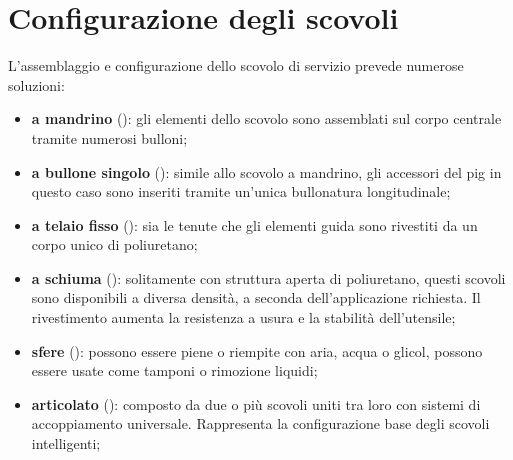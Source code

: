 \section{Configurazione degli scovoli}
L'assemblaggio e configurazione dello scovolo di servizio prevede numerose soluzioni:
\begin{itemize}
	\item \textbf{a mandrino} (): gli elementi dello scovolo sono assemblati sul corpo centrale tramite numerosi bulloni;
	\item \textbf{a bullone singolo} (): simile allo scovolo a mandrino, gli accessori del pig in questo caso sono inseriti tramite un'unica bullonatura longitudinale;
	\item \textbf{a telaio fisso} (): sia le tenute che gli elementi guida sono rivestiti da un corpo unico di poliuretano;
	\item \textbf{a schiuma} (): solitamente con struttura aperta di poliuretano, questi scovoli sono disponibili a diversa densità, a seconda dell'applicazione richiesta. Il rivestimento aumenta la resistenza a usura e la stabilità dell'utensile;
	\item \textbf{sfere} (): possono essere piene o riempite con aria, acqua o glicol, possono essere usate come tamponi o rimozione liquidi;
	\item \textbf{articolato} (): composto da due o più scovoli uniti tra loro con sistemi di accoppiamento universale. Rappresenta la configurazione base degli scovoli intelligenti;

\end{itemize}

